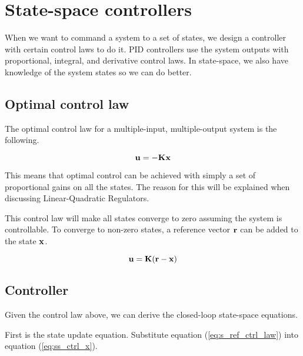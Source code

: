 
\chapter{State-space controllers}

When we want to command a \gls{system} to a set of states, we design a
controller with certain \glspl{control law} to do it. PID controllers use the
system outputs with proportional, integral, and derivative \glspl{control law}.
In state-space, we also have knowledge of the system states so we can do better.

\section{Optimal control law}

The optimal \gls{control law} for a multiple-input, multiple-output system is
the following.

\begin{theorem}
  \begin{equation}
    \mathbf{u} = -\mathbf{K}\mathbf{x}
  \end{equation}
\end{theorem}

This means that optimal control can be achieved with simply a set of
proportional gains on all the states. The reason for this will be explained when
discussing Linear-Quadratic Regulators.

This \gls{control law} will make all states converge to zero assuming the system
is controllable. To converge to non-zero states, a reference vector $\mathbf{r}$
can be added to the state $\mathbf{x}$.

\begin{theorem}
  \begin{equation}
    \mathbf{u} = \mathbf{K}(\mathbf{r} - \mathbf{x}) \label{eq:s_ref_ctrl_law}
  \end{equation}
\end{theorem}

\section{Controller}

Given the \gls{control law} above, we can derive the closed-loop state-space
equations.

First is the state update equation. Substitute equation
(\ref{eq:s_ref_ctrl_law}) into equation (\ref{eq:ss_ctrl_x}).

